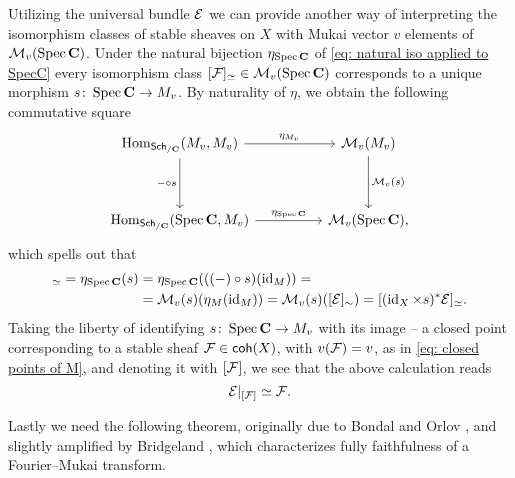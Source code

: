 \begin{remark}
    \label{Points of M are sheaves}
Utilizing the universal bundle $\mathcal E$ we can provide another way of interpreting the isomorphism classes of stable sheaves on $X$ with Mukai vector $v$ \ie elements of $\mathcal M_v(\operatorname{Spec}\mathbf C)$. Under the natural bijection $\eta_{\operatorname{Spec}\mathbf C}$ of \eqref{eq: natural iso applied to SpecC} every isomorphism class $[\mathcal F]_\simeq \in \mathcal M_v(\operatorname{Spec}\mathbf C)$ corresponds to a unique morphism $s \colon \operatorname{Spec}\mathbf C \to M_v$. By naturality of $\eta$, we obtain the following commutative square 
\[\begin{tikzcd}[column sep = normal, row sep = 1.8em]
	\Hom_{\sch{\C}}(M_v, M_v) && \M_v(M_v) \\
	\\
	\Hom_{\sch{\C}}(\spec{\C}, M_v) && \M_v(\spec{\C}),
	\arrow["{\eta_{M_v}}", from=1-1, to=1-3]
	\arrow["{- \circ s}"', from=1-1, to=3-1]
	\arrow["{\M_v(s)}", from=1-3, to=3-3]
	\arrow["\eta_{\spec{\C}}", from=3-1, to=3-3]
\end{tikzcd}\]
which spells out that 
\begin{align*}
    [\F]_\iso = \eta_{\spec{\C}}(s) &= \eta_{\spec{\C}}(((-)\circ s)(\id{M})) = \\
    &= \M_v(s)(\eta_M(\id{M})) = \M_v(s)([\E]_\sim) = [(\id{X} \times s)^*\E]_\iso.
\end{align*}
Taking the liberty of identifying $s \colon \operatorname{Spec}\mathbf C \to M_v$ with its image -- a closed point corresponding to a stable sheaf $\mathcal F \in \mathsf{coh}(X)$, with $v(\mathcal F) = v$, as in \eqref{eq: closed points of M}, and denoting it with $[\mathcal F]$, we see that the above calculation reads
\[
    \mathcal E|_{[\mathcal F]} \simeq \mathcal F.
\]
\end{remark}



Lastly we need the following theorem, originally due to Bondal and Orlov \cite[]{BondalOrlov1995}, and slightly amplified by Bridgeland \cite[]{bridgeland2019equivalencestriangulatedcategoriesfouriermukai}, which characterizes fully faithfulness of a Fourier--Mukai transform. 

